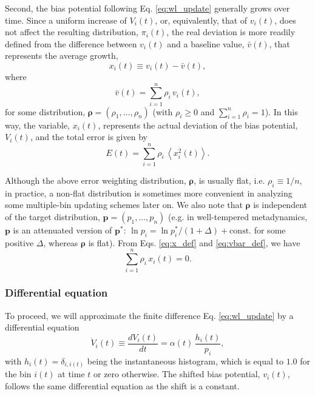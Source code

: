 \documentclass[reprint, superscriptaddress, floatfix]{revtex4-1}
\newcommand{\Err}{E}
\begin{document}
Second, the bias potential following Eq. \eqref{eq:wl_update}
generally grows over time.
%
Since a uniform increase of $V_i(t)$, or, equivalently, that of $v_i(t)$,
does not affect the
resulting distribution, $\pi_i(t)$,
%
the real deviation is more readily defined
from the difference between $v_i(t)$ and a baseline value, $\bar v(t)$,
that represents the average growth\cite{
dama2014},
%
\begin{equation}
  x_i(t) \equiv v_i(t) - \bar v(t)
  ,
\label{eq:x_def}
\end{equation}
%
where
%
\begin{equation}
  \bar v(t)
  = \sum_{i = 1}^n \rho_i \, v_i(t)
  ,
\label{eq:vbar_def}
\end{equation}
for some distribution,
$\pmb \rho = (\rho_1, \dots, \rho_n)$
(with $\rho_i \ge 0$ and $\sum_{i = 1}^n \rho_i = 1$).
%
In this way,
the variable, $x_i(t)$,
represents the actual deviation of the bias potential, $V_i(t)$,
and the total error is given by
%
\begin{equation}
  \Err(t)
  =
  \sum_{i = 1}^n \rho_i \, \left\langle x_i^2(t) \right\rangle
  .
\label{eq:error_def}
\end{equation}




Although the above error weighting distribution, $\pmb\rho$,
is usually flat,
i.e. $\rho_i \equiv 1/n$,
in practice,
a non-flat distribution
is sometimes more convenient in analyzing
some multiple-bin updating schemes later on.
%
We also note that $\pmb\rho$
is independent of
the target distribution,
$\mathbf p = (p_1, \dots, p_n)$
(e.g. in well-tempered metadynamics,
$\mathbf p$ is an attenuated version of
$\mathbf p^*$\cite{
  barducci2008, dama2014}:
$\ln p_i = \ln {p^*_i}/(1+\Delta) + \mathrm{const.}$ for some positive $\Delta$,
whereas $\pmb\rho$ is flat).
%
From Eqs. \eqref{eq:x_def} and \eqref{eq:vbar_def},
we have
%
\begin{equation}
  \sum_{i = 1}^n \rho_i \, x_i(t) = 0
  .
\label{eq:rhox_sum}
\end{equation}
%


\subsubsection{Differential equation}



To proceed, we will
approximate the finite difference Eq. \eqref{eq:wl_update}
by a differential equation
%
\begin{equation}
  \dot V_i(t)
  \equiv
  \frac{ dV_i(t) } { dt }
  =
  \alpha(t) \, \frac{ h_i(t) } { p_i },
  \label{eq:vt_diffeq}
\end{equation}
%
with
%
$
h_i(t) = \delta_{i, i(t)}
$
%
being the instantaneous histogram,
which is equal to $1.0$
for the bin $i(t)$ at time $t$
or zero otherwise.
%
The shifted bias potential, $v_i(t)$,
follows the same differential equation
as the shift is a constant.
\end{document}
